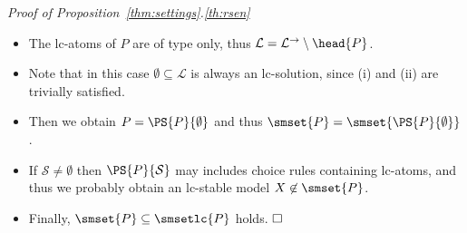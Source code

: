\noindent\textit{Proof of Proposition~\ref{thm:settings}.\ref{th:rsen}}
    \begin{itemize}
     \item The lc-atoms of $P$ are of type 
         only, thus 
        \(
        \mathcal{L}=
        \mathcal{L}^\rightarrow\setminus\head{P}
        \). 
     \item Note that in this case 
        $\emptyset\subseteq\mathcal{L}$ 
        is always an lc-solution, 
        since (i) and (ii) are trivially satisfied. 
     \item Then we obtain 
        $P=\PS{P}{\emptyset}$ 
        and thus 
        \(
        \smset{P}=
        \smset{\PS{P}{\emptyset}}
        \). 
     \item If $\mathcal{S}\neq\emptyset$ 
        then $\PS{P}{\mathcal{S}}$ may includes choice rules 
        containing lc-atoms, and thus we probably obtain an
        lc-stable model $X\not\in\smset{P}$. 
     \item Finally, 
        \(
        \smset{P}\subseteq\smsetlc{P}
        \) 
        holds.
        $\hfill\square$
    \end{itemize}

